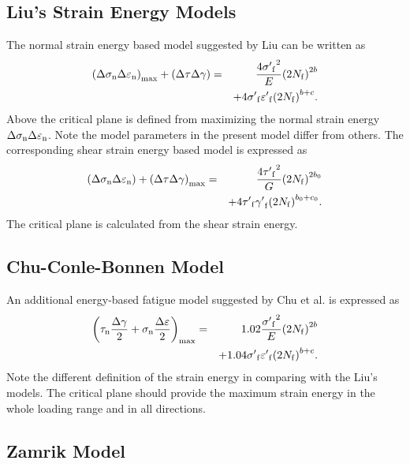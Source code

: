 \documentclass[preprint,5p,twocolumn,11pt,sort&compress]{elsarticle}
\begin{document}
\subsection{Liu's Strain Energy Models}
The normal strain energy based model suggested by Liu \cite{Liu1993} can be written as
\begin{eqnarray*}
{\left( {\Delta {\sigma _{\rm n}}\Delta {\varepsilon _{\rm n}}} \right)_{\max }} + \left( {\Delta \tau \Delta \gamma } \right) &=& \frac{{4{{\sigma '}_{\rm f}}^2}}{E}{\left( {2{N_{\rm f}}} \right)^{2b}}
\\
& & + 4{{\sigma '}_{\rm f}}{{\varepsilon '}_{\rm f}}{\left( {2{N_{\rm f}}} \right)^{b + c}}.
\end{eqnarray*}
Above the critical plane is defined from maximizing the normal strain energy ${\Delta {\sigma _{\rm n}}\Delta {\varepsilon _{\rm n}}}$. Note the model parameters in the present model differ from others. The corresponding shear strain energy based model is expressed as
\begin{eqnarray*}
\left( {\Delta {\sigma _{\rm n}}\Delta {\varepsilon _{\rm n}}} \right) + {\left( {\Delta \tau \Delta \gamma } \right)_{\max }} &=& \frac{{4{{\tau '}_{\rm f}}^2}}{G}{\left( {2{N_{\rm f}}} \right)^{2b_0 }}
\\
&& + 4{{\tau '}_{\rm f}}{{\gamma '}_{\rm f}}{\left( {2{N_{\rm f}}} \right)^{b_0  + c_0 }}.
\end{eqnarray*}
The critical plane is calculated from the shear strain energy.

\subsection{Chu-Conle-Bonnen Model}
An additional energy-based fatigue model suggested by Chu et al. \cite{Chu1993} is expressed as
\begin{eqnarray*}
{\left( {{\tau _{\rm n}}\frac{{\Delta \gamma }}{2} + {\sigma _{\rm n }}\frac{{\Delta \varepsilon }}{2}} \right)_{\max }} &=& 1.02\frac{{{{\sigma '}_{\rm f}}^2}}{E}{\left( {2{N_{\rm f}}} \right)^{2b}} \\
&& + 1.04{{\sigma '}_{\rm f}}{{\varepsilon '}_{\rm f}}{\left( {2{N_{\rm f}}} \right)^{b + c}}.
\end{eqnarray*}
Note the different definition of the strain energy in comparing with the Liu's models. The critical plane should provide the maximum strain energy in the whole loading range and in all directions.
 
\subsection{Zamrik Model}
\end{document}
